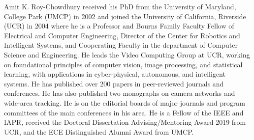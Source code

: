 \documentclass[10pt,journal,compsoc]{IEEEtran}
\begin{document}
\begin{IEEEbiography}
{Amit K. Roy-Chowdhury} 
received his PhD from the University of Maryland, College Park (UMCP) in 2002 and joined the University of California, Riverside (UCR) in 2004 where he is a Professor and Bourns Family Faculty Fellow of Electrical and Computer Engineering, Director of the Center for Robotics and Intelligent Systems, and Cooperating Faculty in the department of Computer Science and Engineering. He leads the Video Computing Group at UCR, working on foundational principles of computer vision, image processing, and statistical learning, with applications in cyber-physical, autonomous, and intelligent systems. He has published over 200 papers in peer-reviewed journals and conferences. He has also published two monographs on camera networks and wide-area tracking. He is on the editorial boards of major journals and program committees of the main conferences in his area. He is a Fellow of the IEEE and IAPR, received the Doctoral Dissertation Advising/Mentoring Award 2019 from UCR, and the ECE Distinguished Alumni Award from UMCP.
\end{IEEEbiography}
%
% 
\end{document}

